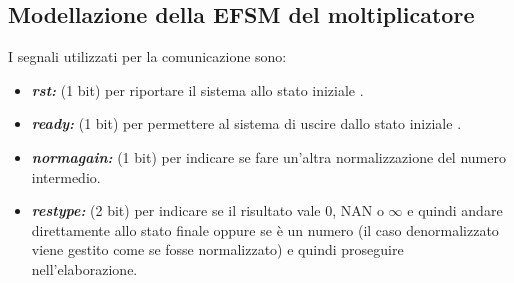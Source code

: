 \documentclass[]{IEEEtran}
\begin{document}
\subsection{Modellazione della EFSM del moltiplicatore}
I segnali utilizzati per la comunicazione sono:
\begin{itemize}
\item {\it\bf rst:} (1 bit) per riportare il sistema allo stato iniziale .
\item {\it\bf ready:} (1 bit) per permettere al sistema di uscire dallo stato iniziale .
\item {\it\bf norm\textunderscore again:} (1 bit) per indicare se fare un'altra normalizzazione del numero intermedio.
\item {\it\bf res\textunderscore type:} (2 bit) per indicare se il risultato vale 0, NAN o \(\infty\) e quindi andare direttamente allo stato finale oppure se è un numero (il caso denormalizzato viene gestito come se fosse normalizzato) e quindi proseguire nell'elaborazione.
\end{itemize}
\end{document}
